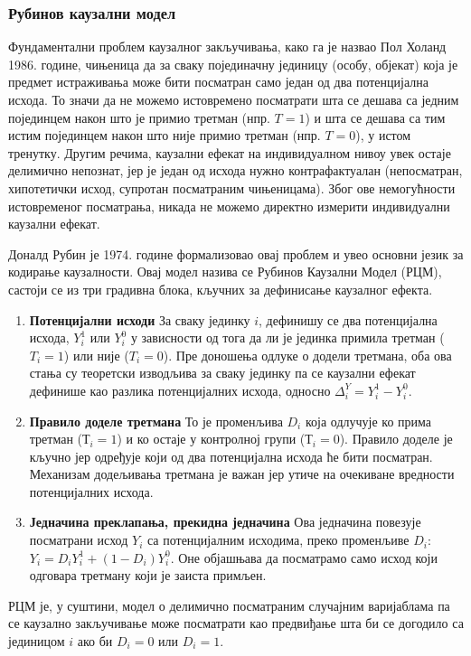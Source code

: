 \documentclass[12pt, a4paper]{article}
\begin{document}
    \subsubsection{Рубинов каузални модел}

Фундаментални проблем каузалног закључивања, како га је назвао Пол Холанд 1986. године, чињеница да за сваку појединачну јединицу (особу, објекат) која је 
предмет истраживања може бити посматран само један од два потенцијална исхода. То значи да не можемо истовремено посматрати шта се дешава са једним појединцем након 
што је примио третман (нпр. $T=1$) и шта се дешава са тим истим појединцем након што није примио третман (нпр. $T=0$), у истом тренутку. Другим речима, каузални ефекат 
на индивидуалном нивоу увек остаје делимично непознат, јер је један од исхода нужно контрафактуалан (непосматран, хипотетички исход, супротан посматраним чињеницама).
Због ове немогућности истовременог посматрања, никада не можемо директно измерити индивидуални каузални ефекат.

Доналд Рубин је 1974. године формализовао овај проблем и увео основни језик за кодирање каузалности. Овај модел назива се Рубинов Каузални Модел (РЦМ), састоји се 
из три градивна блока, кључних за дефинисање каузалног ефекта.
\begin{enumerate}
    \item \textbf{Потенцијални исходи} За сваку јединку $i$, дефинишу се два потенцијална исхода, $Y_i^1$ или $Y_i^0$ у зависности од тога да ли 
    је јединка примила третман ($T_i=1$) или није ($T_i=0$). Пре доношења одлуке о додели третмана, оба ова стања су теоретски изводљива за сваку јединку па се каузални 
    ефекат дефинише као разлика потенцијалних исхода, односно $\Delta^Y_i = Y_i^1 - Y_i^0$.
    \item \textbf{Правило доделе третмана} То је променљива $D_i$ која одлучује ко прима третман ($Т_i=1$) и ко остаје у контролној групи ($Т_i=0$). Правило 
    доделе је кључно јер одређује који од два потенцијална исхода ће бити посматран. Механизам додељивања третмана је важан јер утиче на очекиване вредности потенцијалних исхода.
    \item \textbf{Једначина преклапања, прекидна једначина} Ова једначина повезује посматрани исход $Y_i$ са потенцијалним исходима, преко променљиве $D_i$: $Y_i = D_i Y^1_i + (1 - D_i) Y^0_i$.
    Оне објашњава да посматрамо само исход који одговара третману који је заиста примљен.
\end{enumerate}
РЦМ је, у суштини, модел о делимично посматраним случајним варијаблама па се каузално закључивање може посматрати као предвиђање шта би се догодило са јединицом $i$ 
ако би $D_i=0$ или $D_i=1$.
\end{document}
